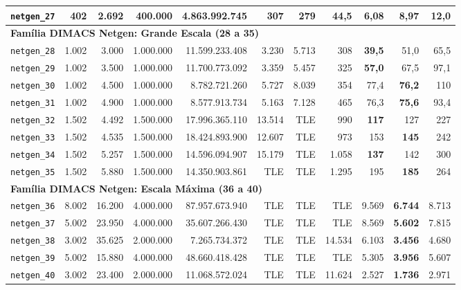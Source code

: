 \begin{longtable}{lrrrrrrrrrr}
\texttt{netgen\_27} & 402 & 2.692 & 400.000 & 4.863.992.745 & 307 & 279 & 44,5 & \textbf{6,08} & 8,97 & 12,0 \\
\midrule
\multicolumn{11}{l}{\textbf{Família DIMACS Netgen: Grande Escala (28 a 35)}} \\
\midrule
\texttt{netgen\_28} & 1.002 & 3.000 & 1.000.000 & 11.599.233.408 & 3.230 & 5.713 & 308 & \textbf{39,5} & 51,0 & 65,5 \\
\texttt{netgen\_29} & 1.002 & 3.500 & 1.000.000 & 11.700.773.092 & 3.359 & 5.457 & 325 & \textbf{57,0} & 67,5 & 97,1 \\
\texttt{netgen\_30} & 1.002 & 4.500 & 1.000.000 & 8.782.721.260 & 5.727 & 8.039 & 354 & 77,4 & \textbf{76,2} & 110 \\
\texttt{netgen\_31} & 1.002 & 4.900 & 1.000.000 & 8.577.913.734 & 5.163 & 7.128 & 465 & 76,3 & \textbf{75,6} & 93,4 \\
\texttt{netgen\_32} & 1.502 & 4.492 & 1.500.000 & 17.996.365.110 & 13.514 & TLE & 990 & \textbf{117} & 127 & 227 \\
\texttt{netgen\_33} & 1.502 & 4.535 & 1.500.000 & 18.424.893.900 & 12.607 & TLE & 973 & 153 & \textbf{145} & 242 \\
\texttt{netgen\_34} & 1.502 & 5.257 & 1.500.000 & 14.596.094.907 & 15.179 & TLE & 1.058 & \textbf{137} & 142 & 300 \\
\texttt{netgen\_35} & 1.502 & 5.880 & 1.500.000 & 14.350.903.861 & TLE & TLE & 1.295 & 195 & \textbf{185} & 264 \\
\midrule
\multicolumn{11}{l}{\textbf{Família DIMACS Netgen: Escala Máxima (36 a 40)}} \\
\midrule
\texttt{netgen\_36} & 8.002 & 16.200 & 4.000.000 & 87.957.673.940 & TLE & TLE & TLE & 9.569 & \textbf{6.744} & 8.713 \\
\texttt{netgen\_37} & 5.002 & 23.950 & 4.000.000 & 35.607.266.430 & TLE & TLE & TLE & 8.569 & \textbf{5.602} & 7.815 \\
\texttt{netgen\_38} & 3.002 & 35.625 & 2.000.000 & 7.265.734.372 & TLE & TLE & 14.534 & 6.103 & \textbf{3.456} & 4.680 \\
\texttt{netgen\_39} & 5.002 & 15.880 & 4.000.000 & 48.660.418.428 & TLE & TLE & TLE & 5.305 & \textbf{3.956} & 5.607 \\
\texttt{netgen\_40} & 3.002 & 23.400 & 2.000.000 & 11.068.572.024 & TLE & TLE & 11.624 & 2.527 & \textbf{1.736} & 2.971 \\
\end{longtable}
\endgroup
